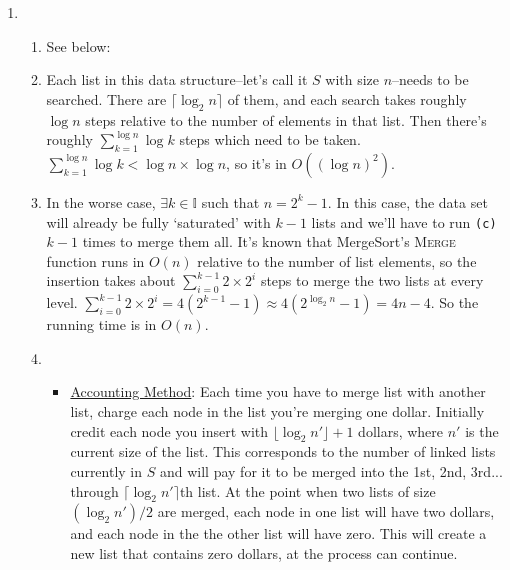 \documentclass{article}
\begin{document}
\begin{enumerate}
\item
    \begin{enumerate}
    \item See below: \\
        \begin{figure}[h]
        \end{figure}
    \item Each list in this data structure--let's call it $S$ with size $n$--needs to be searched. There are $\lceil \log_2 n \rceil$ of them, and each search takes roughly $\log n$ steps relative to the number of elements in that list. Then there's roughly $\sum_{k = 1}^{\log n} \log k$ steps which need to be taken. $\sum_{k = 1}^{\log n} \log k < \log n \times \log n$, so it's in $O((\log n)^2)$.
    \item In the worse case, $\exists k \in \mathbb{I}$ such that $n = 2^k - 1$. In this case, the data set will already be fully `saturated' with $k - 1$ lists and we'll have to run \texttt{(c)} $k - 1$ times to merge them all. It's known that MergeSort's \textsc{Merge} function runs in $O(n)$ relative to the number of list elements, so the insertion takes about $\sum_{i = 0}^{k - 1} 2 \times 2^i$ steps to merge the two lists at every level. $\sum_{i = 0}^{k - 1} 2 \times 2^i = 4(2^{k - 1} - 1) \approx 4(2^{\log_2 n} - 1) = 4n - 4$. So the running time is in $O(n)$.
    \item \begin{itemize}
        \item \underline{Accounting Method}: Each time you have to merge list with another list, charge each node in the list you're merging one dollar. Initially credit each node you insert with $\lfloor \log_2 n' \rfloor + 1$ dollars, where $n'$ is the current size of the list. This corresponds to the number of linked lists currently in $S$ and will pay for it to be merged into the 1st, 2nd, 3rd... through $\lceil \log_2 n' \rceil$th list. At the point when two lists of size $(\log_2 n') / 2$ are merged, each node in one list will have two dollars, and each node in the the other list will have zero. This will create a new list that contains zero dollars, at the process can continue.


\end{itemize}
\end{enumerate}
\end{enumerate}
\end{document}
